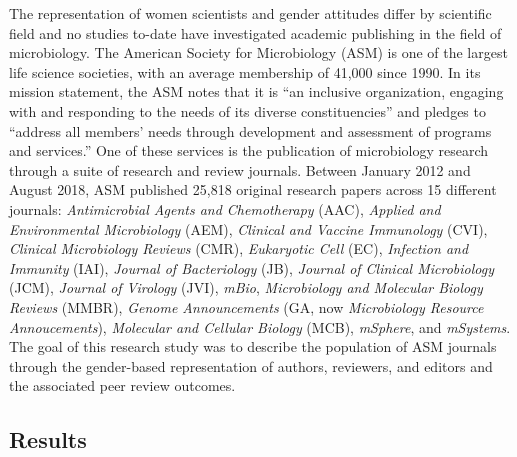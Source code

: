 \documentclass[11pt,]{article}
\begin{document}
The representation of women scientists and gender attitudes differ by
scientific field and no studies to-date have investigated academic
publishing in the field of microbiology. The American Society for
Microbiology (ASM) is one of the largest life science societies, with an
average membership of 41,000 since 1990. In its mission statement, the
ASM notes that it is ``an inclusive organization, engaging with and
responding to the needs of its diverse constituencies'' and pledges to
``address all members' needs through development and assessment of
programs and services.'' One of these services is the publication of
microbiology research through a suite of research and review journals.
Between January 2012 and August 2018, ASM published 25,818 original
research papers across 15 different journals: \emph{Antimicrobial Agents
and Chemotherapy} (AAC), \emph{Applied and Environmental Microbiology}
(AEM), \emph{Clinical and Vaccine Immunology} (CVI), \emph{Clinical
Microbiology Reviews} (CMR), \emph{Eukaryotic Cell} (EC),
\emph{Infection and Immunity} (IAI), \emph{Journal of Bacteriology}
(JB), \emph{Journal of Clinical Microbiology} (JCM), \emph{Journal of
Virology} (JVI), \emph{mBio}, \emph{Microbiology and Molecular Biology
Reviews} (MMBR), \emph{Genome Announcements} (GA, now \emph{Microbiology
Resource Annoucements}), \emph{Molecular and Cellular Biology} (MCB),
\emph{mSphere}, and \emph{mSystems}. The goal of this research study was
to describe the population of ASM journals through the gender-based
representation of authors, reviewers, and editors and the associated
peer review outcomes.

\subsection{Results}\label{results}
\end{document}
